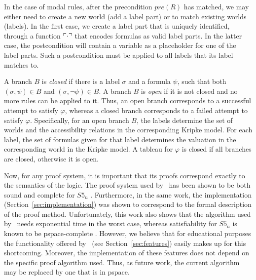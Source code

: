 In the case of modal rules, after the precondition $pre(R)$ has matched, we
may either need to create a new world (add a label part) or to match existing
worlds (labels). In the first case, we create a label part that is uniquely
identified, through a function $\ulcorner\cdot\urcorner$ that encodes formulas as valid
label parts. In the latter case, the postcondition will contain a variable as
a placeholder for one of the label parts. Such a postcondition must be applied
to all labels that its label matches to.

A branch $B$ is {\em closed} if there is a label $\sigma$ and a formula
$\psi$, such that both $(\sigma, \psi) \in B$ and $(\sigma, \neg \psi)
\in B$. A branch $B$ is {\em open} if it is not closed and no more rules can be
applied to it. Thus, an open branch corresponds to a successful attempt to
satisfy $\varphi$, whereas a closed branch corresponds to a failed attempt to
satisfy $\varphi$. 
Specifically, for an open branch $B$, the labels determine the set of worlds
and the accessibility relations in the corresponding Kripke model. For each
label, the set of formulas given for that label determines the valuation in the
corresponding world in the Kripke model.
A tableau for $\varphi$ is closed if all branches are
closed, otherwise it is open. 



Now, for any proof system, it is important that its proofs correspond exactly
to the semantics of the logic.
The proof system used by \oops\ has been shown to be both sound and complete
for $S5_n$ \citep{valkenhoef2008}. 
Furthermore, in the same work, the implementation
(Section~\ref{sec:implementation}) was
shown to correspond to the formal description of the proof method.
Unfortunately, this work also shows that the algorithm used by \oops\ needs exponential time in the worst case, whereas satisfiability for $S5_n$ is known to be {\sc pspace}-complete \citep{halpern1992}.
However, we believe that for educational purposes the functionality  offered
by \oops\ (see Section~\ref{sec:features}) easily makes up for this
shortcoming. Moreover, the implementation of these features does not depend on
the specific proof algorithm used. Thus, as future work, the current algorithm may
be replaced by one that is in {\sc pspace}.



